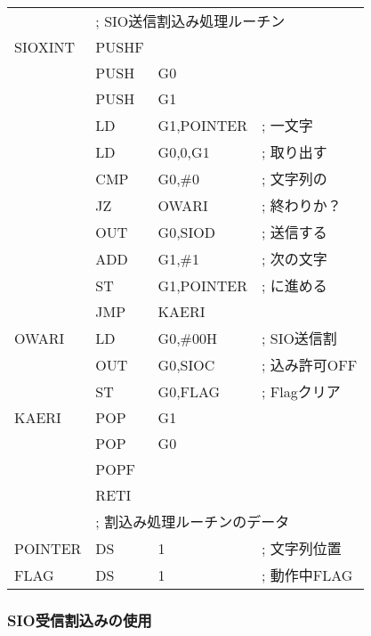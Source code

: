 \begin{center}
{\begin{tabular}{|l|l l l|}
        & \multicolumn{3}{|l|}{; SIO送信割込み処理ルーチン}\\
SIOXINT & PUSHF &                    &                   \\
        & PUSH  & G0                 &                   \\
        & PUSH  & G1                 &                   \\
        & LD    & G1,POINTER         & ; 一文字          \\
        & LD    & G0,0,G1            & ; 取り出す        \\
        & CMP   & G0,\#0             & ; 文字列の        \\
        & JZ    & OWARI              & ; 終わりか？      \\
        & OUT   & G0,SIOD            & ; 送信する        \\
        & ADD   & G1,\#1             & ; 次の文字        \\
        & ST    & G1,POINTER         & ; に進める        \\
        & JMP   & KAERI              &                   \\
OWARI   & LD    & G0,\#00H           & ; SIO送信割       \\
        & OUT   & G0,SIOC            & ; 込み許可OFF     \\
        & ST    & G0,FLAG            & ; Flagクリア      \\
KAERI   & POP   & G1                 &                   \\
        & POP   & G0                 &                   \\
        & POPF  &                    &                   \\
        & RETI  &                    &                   \\
        & \multicolumn{3}{|l|}{; 割込み処理ルーチンのデータ} \\
POINTER & DS    & 1                  & ; 文字列位置      \\
FLAG    & DS    & 1                  & ; 動作中FLAG    \\
\hline
\end{tabular}
}
\end{center}

\subsubsection{SIO受信割込みの使用}

